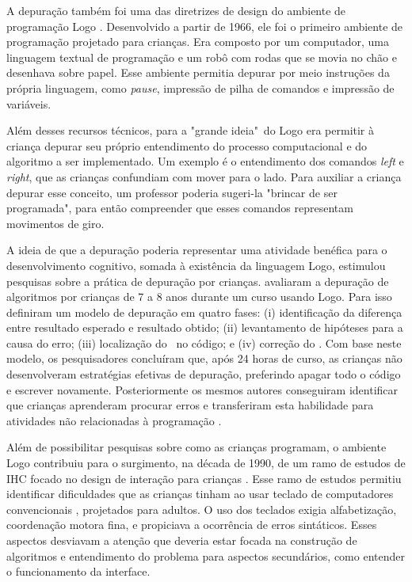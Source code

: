 A depuração também foi uma das diretrizes de design do ambiente de programação Logo \cite{solomon_history_2020}. Desenvolvido a partir de 1966, ele foi o primeiro ambiente de programação projetado para crianças. Era composto por um computador, uma linguagem textual de programação e um robô com rodas que se movia no chão e desenhava sobre papel. Esse ambiente permitia depurar por meio instruções da própria linguagem, como \textit{pause}, impressão de pilha de comandos e impressão de variáveis. 

Além desses recursos técnicos, para  a "grande ideia"\ do Logo era permitir à criança depurar seu próprio entendimento do processo computacional e do algoritmo a ser implementado. Um exemplo é o entendimento dos comandos \textit{left} e \textit{right}, que as crianças confundiam com mover para o lado. Para auxiliar a criança depurar esse conceito, um professor poderia sugeri-la "brincar de ser programada", para então compreender que esses comandos representam movimentos de giro.

A ideia de que a depuração poderia representar uma atividade benéfica para o desenvolvimento cognitivo, somada à existência da linguagem Logo, estimulou pesquisas sobre a prática de depuração por crianças.  avaliaram a depuração de algoritmos por crianças de 7 a 8 anos durante um curso usando Logo. Para isso definiram um modelo de depuração em quatro fases: (i) identificação da diferença entre resultado esperado e resultado obtido; (ii) levantamento de hipóteses para a causa do erro; (iii) localização do \bug\ no código; e (iv) correção do \bug. Com base neste modelo, os pesquisadores concluíram que, após 24 horas de curso, as crianças não desenvolveram estratégias efetivas de depuração, preferindo apagar todo o código e escrever novamente. Posteriormente os mesmos autores conseguiram identificar que crianças aprenderam procurar erros e transferiram esta habilidade para atividades não relacionadas à programação \cite{carver_improving_1987}.

Além de possibilitar pesquisas sobre como as crianças programam, o ambiente Logo contribuiu para o surgimento, na década de 1990, de um ramo de estudos de \ac{IHC} focado no design de interação para crianças \cite{hourcade_child-computer_2015}. Esse ramo de estudos permitiu identificar dificuldades que as crianças tinham ao usar teclado de computadores convencionais \cite{mcnerney_turtles_2004}, projetados para adultos. O uso dos teclados exigia alfabetização, coordenação motora fina, e propiciava a ocorrência de erros sintáticos. Esses aspectos desviavam a atenção que deveria estar focada na construção de algoritmos e entendimento do problema para aspectos secundários, como entender o funcionamento da interface.

